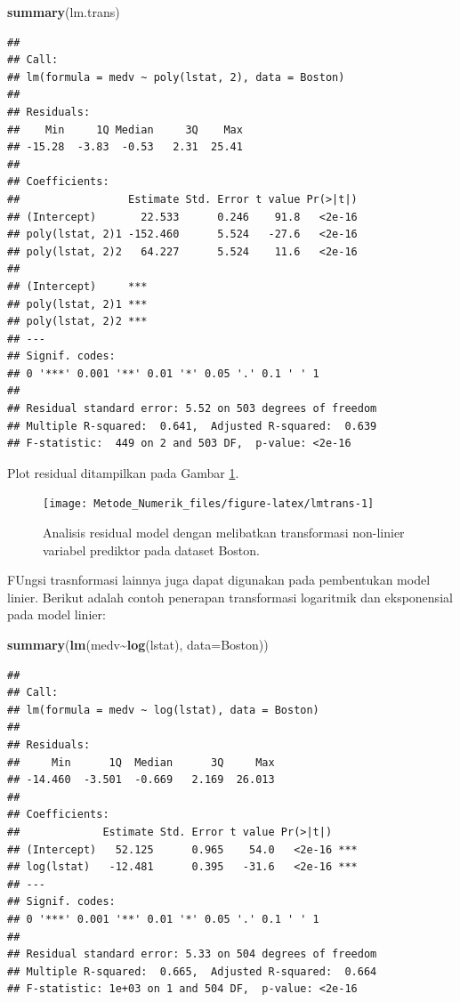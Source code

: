 \documentclass[
]{book}
\newenvironment{Shaded}{\begin{snugshade}}{\end{snugshade}}
\newcommand{\AttributeTok}[1]{\textcolor[rgb]{0.13,0.29,0.53}{#1}}
\newcommand{\FunctionTok}[1]{\textcolor[rgb]{0.13,0.29,0.53}{\textbf{#1}}}
\newcommand{\NormalTok}[1]{#1}
\newcommand{\SpecialCharTok}[1]{\textcolor[rgb]{0.81,0.36,0.00}{\textbf{#1}}}
\theoremstyle{definition}
\theoremstyle{definition}
\theoremstyle{definition}
\theoremstyle{definition}
\theoremstyle{remark}
\begin{document}
\begin{Shaded}
\begin{Highlighting}[]
\FunctionTok{summary}\NormalTok{(lm.trans)}
\end{Highlighting}
\end{Shaded}

\begin{verbatim}
## 
## Call:
## lm(formula = medv ~ poly(lstat, 2), data = Boston)
## 
## Residuals:
##    Min     1Q Median     3Q    Max 
## -15.28  -3.83  -0.53   2.31  25.41 
## 
## Coefficients:
##                 Estimate Std. Error t value Pr(>|t|)
## (Intercept)       22.533      0.246    91.8   <2e-16
## poly(lstat, 2)1 -152.460      5.524   -27.6   <2e-16
## poly(lstat, 2)2   64.227      5.524    11.6   <2e-16
##                    
## (Intercept)     ***
## poly(lstat, 2)1 ***
## poly(lstat, 2)2 ***
## ---
## Signif. codes:  
## 0 '***' 0.001 '**' 0.01 '*' 0.05 '.' 0.1 ' ' 1
## 
## Residual standard error: 5.52 on 503 degrees of freedom
## Multiple R-squared:  0.641,  Adjusted R-squared:  0.639 
## F-statistic:  449 on 2 and 503 DF,  p-value: <2e-16
\end{verbatim}

Plot residual ditampilkan pada Gambar \ref{fig:lmtrans}.

\begin{figure}

{\centering \texttt{[image: Metode\_Numerik\_files/figure-latex/lmtrans-1]} 

}

\caption{Analisis residual model dengan melibatkan transformasi non-linier variabel prediktor pada dataset Boston.}\label{fig:lmtrans}
\end{figure}

FUngsi trasnformasi lainnya juga dapat digunakan pada pembentukan model linier. Berikut adalah contoh penerapan transformasi logaritmik dan eksponensial pada model linier:

\begin{Shaded}
\begin{Highlighting}[]
\FunctionTok{summary}\NormalTok{(}\FunctionTok{lm}\NormalTok{(medv}\SpecialCharTok{\textasciitilde{}}\FunctionTok{log}\NormalTok{(lstat), }\AttributeTok{data=}\NormalTok{Boston))}
\end{Highlighting}
\end{Shaded}

\begin{verbatim}
## 
## Call:
## lm(formula = medv ~ log(lstat), data = Boston)
## 
## Residuals:
##     Min      1Q  Median      3Q     Max 
## -14.460  -3.501  -0.669   2.169  26.013 
## 
## Coefficients:
##             Estimate Std. Error t value Pr(>|t|)    
## (Intercept)   52.125      0.965    54.0   <2e-16 ***
## log(lstat)   -12.481      0.395   -31.6   <2e-16 ***
## ---
## Signif. codes:  
## 0 '***' 0.001 '**' 0.01 '*' 0.05 '.' 0.1 ' ' 1
## 
## Residual standard error: 5.33 on 504 degrees of freedom
## Multiple R-squared:  0.665,  Adjusted R-squared:  0.664 
## F-statistic: 1e+03 on 1 and 504 DF,  p-value: <2e-16
\end{verbatim}
\end{document}
